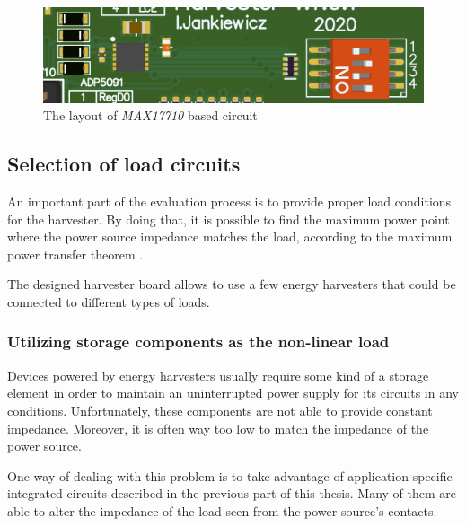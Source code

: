 \documentclass[12pt,a4paper]{article}
\begin{document}
\begin{figure}[ht!]
\includegraphics[scale=1.0]{max17710_layout.png}
\caption{The layout of \textit{MAX17710} based circuit}
\label{fig:max17710layout}
\end{figure}
\par

\subsection{Selection of load circuits}
An important part of the evaluation process is to provide proper load conditions for the harvester. By doing that, it is possible to find the maximum power point where the power source impedance matches the load, according to the maximum power transfer theorem \cite{mppt}.
\par
The designed harvester board allows to use a few energy harvesters that could be connected to different types of loads. 

\subsubsection{Utilizing storage components as the non-linear load}
Devices powered by energy harvesters usually require some kind of a storage element in order to maintain an uninterrupted power supply for its circuits in any conditions. Unfortunately, these components are not able to provide constant impedance. Moreover, it is often way too low to match the impedance of the power source.
\par

One way of dealing with this problem is to take advantage of application-specific integrated circuits described in the previous part of this thesis. Many of them are able to alter the impedance of the load seen from the power source's contacts.
\end{document}
